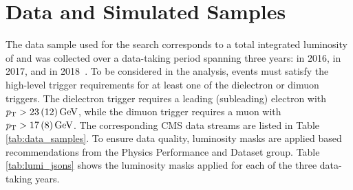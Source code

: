 \chapter{Data and Simulated Samples}\label{sec:data}

The data sample used for the \hzg search corresponds to a total integrated luminosity of \LumiT\fbinv and was collected over a data-taking period spanning three years: \Lumia\fbinv in 2016, \Lumib\fbinv in 2017, and \Lumic\fbinv in 2018~\cite{CMS-LUM-17-003,LUM-17-004,LUM-18-002}. 
To be considered in the analysis, events must satisfy the high-level trigger requirements for at least one of the dielectron or dimuon triggers.
The dielectron trigger requires a leading (subleading) electron with
$p_{\mathrm{T}} > 23\,(12)\,\text{Ge\hspace{-.08em}V}$, while the dimuon trigger requires a muon with $p_{\mathrm{T}} > 17\,(8)\,\text{Ge\hspace{-.08em}V}$.
The corresponding CMS data streams are listed in Table \ref{tab:data_samples}. To ensure data quality, luminosity masks are applied based recommendations from the Physics Performance and Dataset group. Table \ref{tab:lumi_jsons} shows the luminosity masks applied for each of the three data-taking years.

